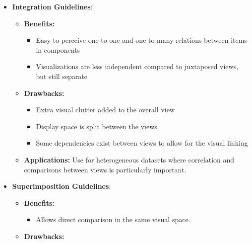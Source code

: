 \documentclass{report}
\begin{document}
\begin{itemize}
\begin{itemize}
\begin{itemize}
                        \item Space is divided between the views, yielding less space for each view
                    \end{itemize}
                \item Applications: Use for heterogeneous datasets consisting of many different types of data, or for where different independent visualizations need to be combined.
            \end{itemize}
        \item \textbf{Integration Guidelines}: 
            \begin{itemize}
                \item \textbf{Benefits:}
                    \begin{itemize}
                        \item Easy to perceive one-to-one and one-to-many relations between items in components
                        \item Visualizations are less independent compared to juxtaposed views, but still separate
                    \end{itemize}
                \item \textbf{Drawbacks:}
                    \begin{itemize}
                        \item Extra visual clutter added to the overall view
                        \item Display space is split between the views
                        \item Some dependencies exist between views to allow for the visual linking
                    \end{itemize}
                \item \textbf{Applications:} Use for heterogeneous datasets where correlation and comparisons between views is particularly important.
            \end{itemize}
        \item \textbf{Superimposition Guidelines}: 
            \begin{itemize}
                \item \textbf{Benefits:}
                    \begin{itemize}
                        \item Allows direct comparison in the same visual space.
                    \end{itemize}
                \item \textbf{Drawbacks:}

\end{itemize}
\end{itemize}
\end{document}
